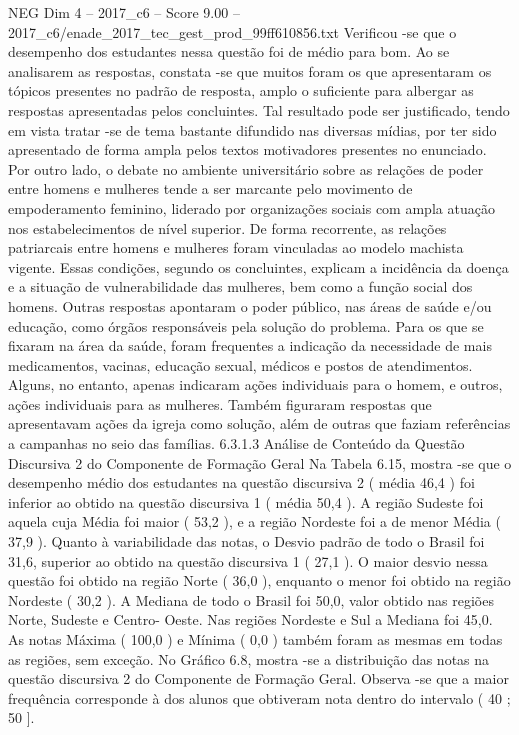 \begin{textsample}{NEG Dim 4 – 2017\_c6 – Score 9.00 – 2017\_c6/enade\_2017\_tec\_gest\_prod\_99ff610856.txt}
Verificou -se que o desempenho dos estudantes nessa questão foi de médio para bom.
Ao se analisarem as respostas, constata -se que muitos foram os que apresentaram os tópicos presentes no padrão de resposta, amplo o suficiente para albergar as respostas apresentadas pelos concluintes.
Tal resultado pode ser justificado, tendo em vista tratar -se de tema bastante difundido nas diversas mídias, por ter sido apresentado de forma ampla pelos textos motivadores presentes no enunciado.
Por outro lado, o debate no ambiente universitário sobre as relações de poder entre homens e mulheres tende a ser marcante pelo movimento de empoderamento feminino, liderado por organizações sociais com ampla atuação nos estabelecimentos de nível superior.
De forma recorrente, as relações patriarcais entre homens e mulheres foram vinculadas ao modelo machista vigente.
Essas condições, segundo os concluintes, explicam a incidência da doença e a situação de vulnerabilidade das mulheres, bem como a função social dos homens.
Outras respostas apontaram o poder público, nas áreas de saúde e/ou educação, como órgãos responsáveis pela solução do problema.
Para os que se fixaram na área da saúde, foram frequentes a indicação da necessidade de mais medicamentos, vacinas, educação sexual, médicos e postos de atendimentos.
Alguns, no entanto, apenas indicaram ações individuais para o homem, e outros, ações individuais para as mulheres.
Também figuraram respostas que apresentavam ações da igreja como solução, além de outras que faziam referências a campanhas no seio das famílias. 6.3.1.3 Análise de Conteúdo da Questão Discursiva 2 do Componente de Formação Geral Na Tabela 6.15, mostra -se que o desempenho médio dos estudantes na questão discursiva 2 ( média 46,4 ) foi inferior ao obtido na questão discursiva 1 ( média 50,4 ).
A região Sudeste foi aquela cuja Média foi maior ( 53,2 ), e a região Nordeste foi a de menor Média ( 37,9 ).
Quanto à variabilidade das notas, o Desvio padrão de todo o Brasil foi 31,6, superior ao obtido na questão discursiva 1 ( 27,1 ).
O maior desvio nessa questão foi obtido na região Norte ( 36,0 ), enquanto o menor foi obtido na região Nordeste ( 30,2 ).
A Mediana de todo o Brasil foi 50,0, valor obtido nas regiões Norte, Sudeste e Centro- Oeste.
Nas regiões Nordeste e Sul a Mediana foi 45,0.
As notas Máxima ( 100,0 ) e Mínima ( 0,0 ) também foram as mesmas em todas as regiões, sem exceção.
No Gráfico 6.8, mostra -se a distribuição das notas na questão discursiva 2 do Componente de Formação Geral.
Observa -se que a maior frequência corresponde à dos alunos que obtiveram nota dentro do intervalo ( 40 ; 50 ].

\end{textsample}
